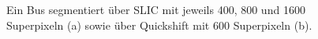 \begin{figure}[t]
\centering
{}
  \caption[\gls{SLIC} und Quickshift Beispielresultat]{Ein Bus segmentiert über \gls{SLIC} mit jeweils 400, 800 und 1600 Superpixeln (a) sowie über Quickshift mit 600 Superpixeln (b).}
\label{fig:slic_quickshift}
\end{figure}
